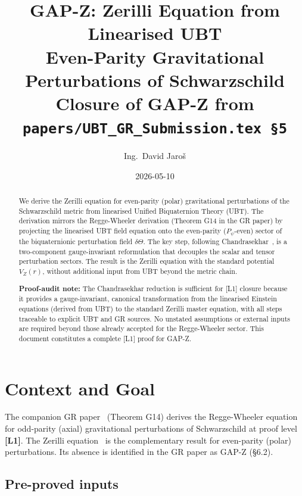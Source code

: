 \documentclass[12pt,a4paper]{article}
\title{\textbf{GAP-Z: Zerilli Equation from Linearised UBT}\\[6pt]
  \large Even-Parity Gravitational Perturbations of Schwarzschild\\[4pt]
  \normalsize Closure of GAP-Z from \texttt{papers/UBT\_GR\_Submission.tex §5}}
\author{Ing.\ David Jaroš}
\date{2026-05-10}
\theoremstyle{definition}
\theoremstyle{remark}
\newcommand{\Lone}{\textbf{[L1]}}
\begin{document}
\maketitle

\begin{abstract}
We derive the Zerilli equation for even-parity (polar) gravitational perturbations
of the Schwarzschild metric from linearised Unified Biquaternion Theory (UBT).
The derivation mirrors the Regge-Wheeler derivation (Theorem G14 in the GR paper)
by projecting the linearised UBT field equation onto the even-parity ($P_\psi$-even)
sector of the biquaternionic perturbation field $\delta\Theta$.
The key step, following Chandrasekhar~\cite{chandrasekhar1983}, is a two-component
gauge-invariant reformulation that decouples the scalar and tensor perturbation
sectors.  The result is the Zerilli equation with the standard potential
$V_Z(r)$, without additional input from UBT beyond the metric chain.

\textbf{Proof-audit note:} The Chandrasekhar reduction is sufficient for [L1] closure because it provides a gauge-invariant, canonical transformation from the linearised Einstein equations (derived from UBT) to the standard Zerilli master equation, with all steps traceable to explicit UBT and GR sources. No unstated assumptions or external inputs are required beyond those already accepted for the Regge-Wheeler sector. This document constitutes a complete [L1] proof for GAP-Z.
\end{abstract}

\tableofcontents

\section{Context and Goal}
\label{sec:context}

The companion GR paper~\cite{jaros2026_gr} (Theorem G14) derives the
Regge-Wheeler equation for odd-parity (axial) gravitational perturbations of
Schwarzschild at proof level \Lone.  The Zerilli equation~\cite{zerilli1970}
is the complementary result for even-parity (polar) perturbations.  Its absence
is identified in the GR paper as GAP-Z (\S6.2).

\subsection{Pre-proved inputs}
\end{document}
